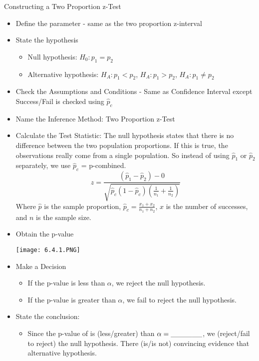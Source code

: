 \documentclass[../stats.tex]{subfiles}
\begin{document}
Constructing a Two Proportion z-Test 

\begin{itemize}
    \item Define the parameter - same as the two proportion z-interval 
    \item State the hypothesis 
    \begin{itemize}
        \item Null hypothesis: $H_0: p_1=p_2$
        \item Alternative hypothesis: $H_A: p_1<p_2$, $H_A: p_1>p_2$, $H_A: p_1\neq p_2$
    \end{itemize}
    \item Check the Assumptions and Conditions - Same as Confidence Interval except Success/Fail is checked using $\hat{p}_c$
    \item Name the Inference Method: Two Proportion z-Test 
    \item Calculate the Test Statistic: The null hypothesis states that there is no difference between the two population proportions. If this is true, the observations really come from a single population. So instead of using $\hat{p}_1$ or $\hat{p}_2$ separately, we use $\hat{p}_c$ = p-combined.
    \[ z=\frac{(\hat{p}_1-\hat{p}_2)-0}{\sqrt{\hat{p}_c(1-\hat{p}_c)\left(\frac{1}{n_1}+\frac{1}{n_2}\right)}} \]
    Where $\hat{p}$ is the sample proportion, $\hat{p}_c=\frac{x_1+x_2}{n_1+n_2}$, $x$ is the number of successes, and $n$ is the sample size.
    \item Obtain the p-value 
    \begin{center}
        \texttt{[image: 6.4.1.PNG]}
    \end{center}
    \item Make a Decision 
    \begin{itemize}
        \item If the p-value is less than $\alpha$, we reject the null hypothesis.
        \item If the p-value is greater than $\alpha$, we fail to reject the null hypothesis.
    \end{itemize}
    \item State the conclusion:
    \begin{itemize}
        \item Since the p-value of \blank is (less/greater) than $\alpha=\_\_\_\_\_\_$, we (reject/fail to reject) the null hypothesis. There (is/is not) convincing evidence that {alternative hypothesis}.
    \end{itemize}
\end{itemize}
\end{document}
